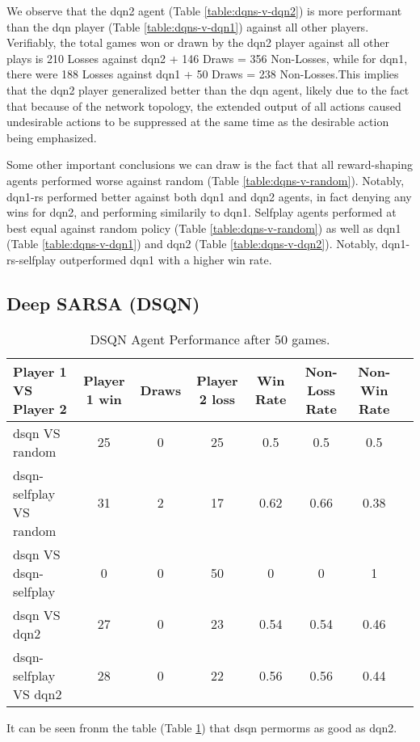 \documentclass[../report.tex]{subfiles}
\begin{document}
We observe that the dqn2 agent (Table \ref{table:dqns-v-dqn2}) is more performant than the dqn player (Table \ref{table:dqns-v-dqn1}) against all other players. Verifiably, the total games won or drawn by the dqn2 player against all other plays is 210 Losses against dqn2 + 146 Draws = 356 Non-Losses, while for dqn1, there were 188 Losses against dqn1 + 50 Draws =  238 Non-Losses.This implies that the dqn2 player generalized better than the dqn agent, likely due to the fact that because of the network topology, the extended output of all actions caused undesirable actions to be suppressed at the same time as the desirable action being emphasized. 

Some other important conclusions we can draw is the fact that all reward-shaping agents performed worse against random (Table \ref{table:dqns-v-random}). Notably, dqn1-rs performed better against both dqn1 and dqn2 agents, in fact denying any wins for dqn2, and performing similarily to dqn1. Selfplay agents performed at best equal against random policy (Table \ref{table:dqns-v-random}) as well as dqn1 (Table \ref{table:dqns-v-dqn1}) and dqn2 (Table \ref{table:dqns-v-dqn2}). Notably, dqn1-rs-selfplay outperformed dqn1 with a higher win rate.

\subsection{Deep SARSA (DSQN)}

\begin{table}[!htbp]
    \centering
    \caption{DSQN Agent Performance after 50 games.}\label{table:dsqn}
    \begin{tabular}{lccccccc}
        \toprule
        Player 1 VS Player 2            & Player 1 win & Draws & Player 2 loss & Win Rate & Non-Loss Rate & Non-Win Rate \\
        \midrule
        dsqn VS random                  & 25    & 0    & 25      & 0.5        & 0.5             & 0.5            \\
        dsqn-selfplay VS random         & 31   & 2     & 17     & 0.62     & 0.66          & 0.38         \\
        dsqn VS dsqn-selfplay           & 0   & 0     & 50     & 0     & 0         & 1         \\
        dsqn VS dqn2                    & 27  & 0     & 23     & 0.54     & 0.54          & 0.46         \\
        dsqn-selfplay VS dqn2           & 28   & 0     & 22     & 0.56      & 0.56           & 0.44          \\
       \bottomrule
    \end{tabular}
\end{table}

It can be seen fronm the table (Table \ref{table:dsqn}) that dsqn permorms as good as dqn2.
\end{document}
